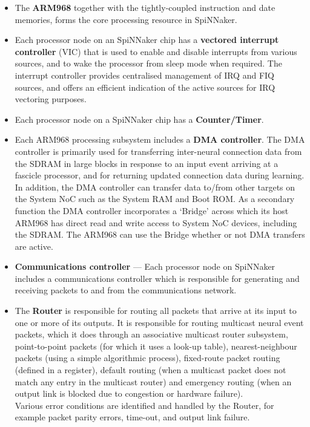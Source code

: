 \documentclass[a4paper, 11pt]{article}
\newcounter{subsubsubsection}[subsubsection]
\begin{document}
\begin{itemize}
	\setlength\itemsep{-2pt}
	\item The \textbf{ARM968} together with the tightly-coupled instruction and date memories, forms the core processing resource in SpiNNaker.
	\item Each processor node on an SpiNNaker chip has a \textbf{vectored interrupt controller} (VIC) that is used to enable  and disable  interrupts  from  various  sources,  and  to wake  the processor  from  sleep mode when required. The interrupt controller provides centralised management of IRQ and FIQ sources, and offers an efficient indication of the active sources for IRQ vectoring purposes.
	\item Each processor node on a SpiNNaker chip has a \textbf{Counter/Timer}.
	\item Each ARM968 processing subsystem includes a \textbf{DMA controller}. The DMA controller is primarily used for transferring inter-neural connection data from the SDRAM in large blocks in response to an  input  event  arriving  at a  fascicle processor, and  for  returning updated connection data during learning. In addition, the DMA controller can transfer data to/from other targets on the System NoC such as the System RAM and Boot ROM. As a secondary function the DMA controller incorporates a `Bridge' across which its host ARM968 has direct read and write access to System NoC devices, including the SDRAM. The ARM968 can use the Bridge whether or not DMA transfers are active.
	\item	\textbf{Communications controller} --- Each processor node on SpiNNaker includes a communications controller which is responsible for generating and receiving packets to and from the communications network.
	\item The \textbf{Router} is responsible for routing all packets that arrive at its input to one or more of its outputs. It  is  responsible  for  routing multicast neural event packets, which  it does  through an associative multicast  router  subsystem,  point-to-point  packets  (for  which  it  uses  a  look-up  table),  nearest-neighbour packets  (using  a  simple  algorithmic process),  fixed-route packet  routing  (defined  in  a register), default routing (when a multicast packet does not match any entry in the multicast router) and emergency routing (when an output link is blocked due to congestion or hardware failure).\\
	Various error conditions are identified and handled by the Router, for example packet parity errors, time-out, and output link failure.

\end{itemize}
\end{document}
